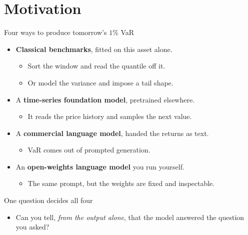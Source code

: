 \documentclass[9pt, aspectratio=169, t]{beamer}
\begin{document}
\section{Motivation}
\begin{frame}{Four ways to produce tomorrow's $1\%$ VaR}
  \begin{itemize}
    \item \textbf{Classical benchmarks}, fitted on this asset alone.
      \begin{itemize}
        \item Sort the window and read the quantile off it.
        \item Or model the variance and impose a tail shape.
      \end{itemize}
    \item A \textbf{time-series foundation model}, pretrained elsewhere.
      \begin{itemize}
        \item It reads the price history and samples the next value.
      \end{itemize}
    \item A \textbf{commercial language model}, handed the returns as text.
      \begin{itemize}
        \item VaR  comes out of prompted generation.
      \end{itemize}
    \item An \textbf{open-weights language model} you run yourself.
      \begin{itemize}
        \item The same prompt, but the weights are fixed and inspectable.

      \end{itemize}
  \end{itemize}
  \vspace{0.4em}
  \begin{alertblock}{One question decides all four}
    \begin{itemize}
      \item Can you tell, \emph{from the output alone}, that the model answered the
            question you asked?
    \end{itemize}
  \end{alertblock}
\end{frame}
\end{document}
